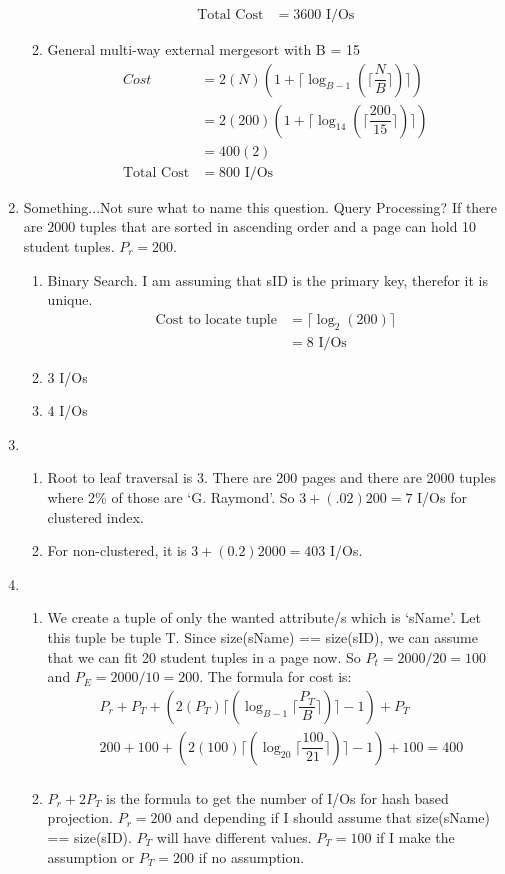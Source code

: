 \documentclass{report}
\begin{document}
\begin{enumerate}
\begin{enumerate}
\begin{align*}
				\text{Total Cost} &= 3600 \text{ I/Os}
			\end{align*}
			\item General multi-way external mergesort with B = 15
			\begin{align*}
				Cost &= 2(N)(1 + \lceil\log_{B-1}(\lceil\dfrac{N}{B}\rceil)\rceil) \\
				&= 2(200)(1 + \lceil\log_{14}(\lceil\dfrac{200}{15}\rceil)\rceil) \\
				&= 400(2) \\
				\text{Total Cost} &= 800 \text{ I/Os}
			\end{align*}
		\end{enumerate}
		\item Something...Not sure what to name this question. Query Processing?
		If there are $2000$ tuples that are sorted in ascending order and a page can hold 10 student tuples. $P_r = 200$.
		\begin{enumerate}
			\item Binary Search. I am assuming that sID is the primary key, therefor it is unique.
			\begin{align*}
				\text{Cost to locate tuple} &= \lceil \log_2(200) \rceil \\
				&= 8 \text{ I/Os}
			\end{align*}

			\item $3$ I/Os
			\item $4$ I/Os
		\end{enumerate}
		\item 
		\begin{enumerate}
			\item Root to leaf traversal is $3$. There are 200 pages and there are 2000 tuples where 2\% of those are `G. Raymond'. So $3 + (.02)200 = 7$ I/Os for clustered index.
			\item For non-clustered, it is $3 + (0.2)2000 = 403$ I/Os.
		\end{enumerate}
		\item 
		\begin{enumerate}
			\item We create a tuple of only the wanted attribute/s which is `sName'. Let this tuple be tuple T. Since size(sName) == size(sID), we can assume that we can fit 20 student tuples in a page now. So $P_t = 2000/20 = 100$ and $P_E = 2000/10 = 200$. The formula for cost is:
			\begin{align*}
				&P_r + P_T + ( 2(P_T) \lceil(\log_{B-1} \lceil\dfrac{P_T}{B}\rceil)\rceil - 1) + P_T \\
				&200 + 100 + ( 2(100) \lceil(\log_{20} \lceil\dfrac{100}{21}\rceil)\rceil -1 ) + 100 = 400 \\
			\end{align*}
			\item $P_r + 2 P_T$ is the formula to get the number of I/Os for hash based projection. $P_r = 200$ and depending if I should assume that size(sName) == size(sID). $P_T$ will have different values. $P_T = 100$ if I make the assumption or $P_T = 200$ if no assumption. \\


\end{enumerate}
\end{enumerate}
\end{document}
